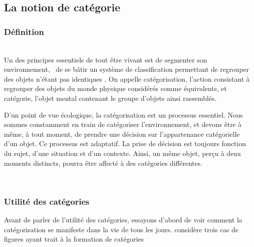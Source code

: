 \subsection{La notion de catégorie}

\subsubsection{Définition}

 \\

Un des principes essentiels de tout être vivant est de segmenter son environnement, \ie~de se bâtir un système de classification permettant de regrouper des objets n'étant pas identiques \citep[p. 1]{rosch1978cognition}. On appelle catégorisation, l'action consistant à regrouper des objets du monde physique considérés comme équivalents, et catégorie, l'objet mental contenant le groupe d'objets ainsi rassemblés. 
 
D'un point de vue écologique, la catégorisation est un processus essentiel. Nous sommes constamment en train de catégoriser l'environnement, et devons être à même, à tout moment, de prendre une décision sur l'appartenance catégorielle d'un objet. Ce processus est adaptatif. La prise de décision est toujours fonction du sujet, d'une situation et d'un contexte. Ainsi, un même objet, perçu à deux moments distincts, pourra être affecté à des catégories différentes.

 \\

\subsubsection{Utilité des catégories}

Avant de parler de l'utilité des catégories, essayons d'abord de voir comment la catégorisation se manifeste dans la vie de tous les jours.  \citep{anderson1991adaptive} considère trois cas de figures ayant trait à la formation de catégories  \\

